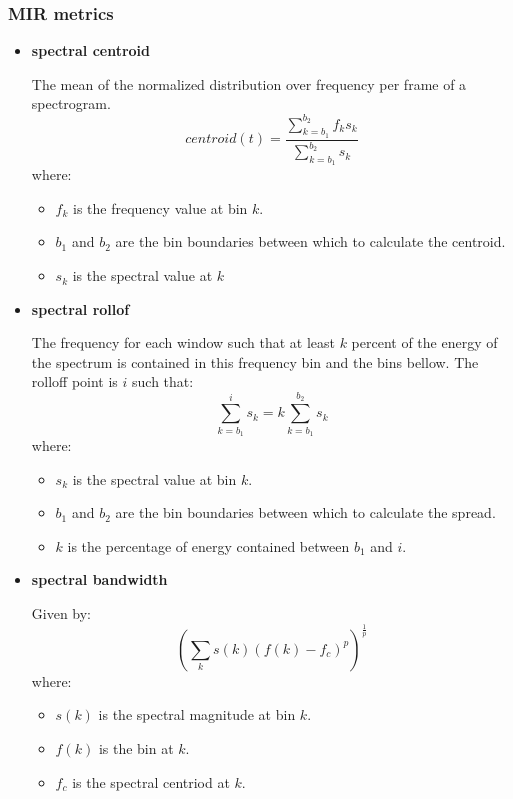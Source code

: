 \documentclass[11pt]{article}
\begin{document}
\subsubsection{MIR metrics}
\label{sec:org59595af}
\begin{itemize}
\item \textbf{ spectral centroid }
\label{sec:org722ed3e}

    The mean of the normalized distribution over frequency per frame of a spectrogram.
    \[ centroid(t) = \frac{\sum^{b_{2}}_{k=b_{1}}f_{k}s_{k}}{\sum^{b_{2}}_{k=b_{1}}s_{k}} \]
    where:
    \begin{itemize}
      \item $f_{k}$ is the frequency value at bin $k$.
      \item $b_{1}$ and $b_{2}$ are the bin boundaries between which to calculate the centroid.
      \item $s_{k}$ is the spectral value at $k$
    \end{itemize}

\item \textbf{ spectral rollof }
\label{sec:org8ba1512}

    The frequency for each window such that at least $k$ percent of the energy of the spectrum is contained in this frequency bin and the bins bellow. The rolloff point is $i$ such that:
    \[ \sum^{i}_{k=b_{1}}s_{k} = k\sum^{b_{2}}_{k=b_{1}}s_{k} \]
    where:
    \begin{itemize}
      \item $s_{k}$ is the spectral value at bin $k$.
      \item $b_{1}$ and $b_{2}$ are the bin boundaries between which to calculate the spread.
      \item $k$ is the percentage of energy contained between $b_{1}$ and $i$.
    \end{itemize}

\item \textbf{ spectral bandwidth }
\label{sec:org9dcacf6}

    Given by:
    \[ (\sum_{k}s(k)(f(k) - f_{c})^{p})^{\frac{1}{p}}\]
    where:
    \begin{itemize}
      \item $s( k )$ is the spectral magnitude at bin $k$.
      \item $f( k )$ is the bin at $k$.
      \item $f_{c}$ is the spectral centriod at $k$.
    \end{itemize}


\end{itemize}
\end{document}
